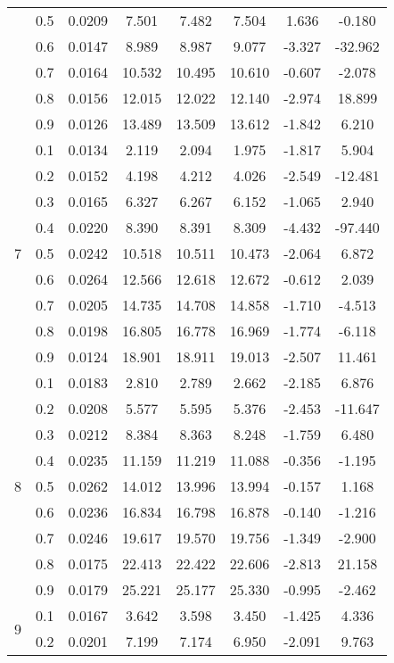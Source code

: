 \documentclass[11pt,a4paper]{report}
\begin{document}
\begin{longtable}{ | c | c || c | c | c | c | c | c | }
 & 0.5 & 0.0209 & 7.501 & 7.482 & 7.504 & 1.636 & -0.180 \\
 & 0.6 & 0.0147 & 8.989 & 8.987 & 9.077 & -3.327 & -32.962 \\
 & 0.7 & 0.0164 & 10.532 & 10.495 & 10.610 & -0.607 & -2.078 \\
 & 0.8 & 0.0156 & 12.015 & 12.022 & 12.140 & -2.974 & 18.899 \\
 & 0.9 & 0.0126 & 13.489 & 13.509 & 13.612 & -1.842 & 6.210 \\
 \hline
\multirow{9}{*}{7} & 0.1 & 0.0134 & 2.119 & 2.094 & 1.975 & -1.817 & 5.904 \\
 & 0.2 & 0.0152 & 4.198 & 4.212 & 4.026 & -2.549 & -12.481 \\
 & 0.3 & 0.0165 & 6.327 & 6.267 & 6.152 & -1.065 & 2.940 \\
 & 0.4 & 0.0220 & 8.390 & 8.391 & 8.309 & -4.432 & -97.440 \\
 & 0.5 & 0.0242 & 10.518 & 10.511 & 10.473 & -2.064 & 6.872 \\
 & 0.6 & 0.0264 & 12.566 & 12.618 & 12.672 & -0.612 & 2.039 \\
 & 0.7 & 0.0205 & 14.735 & 14.708 & 14.858 & -1.710 & -4.513 \\
 & 0.8 & 0.0198 & 16.805 & 16.778 & 16.969 & -1.774 & -6.118 \\
 & 0.9 & 0.0124 & 18.901 & 18.911 & 19.013 & -2.507 & 11.461 \\
 \hline
\multirow{9}{*}{8} & 0.1 & 0.0183 & 2.810 & 2.789 & 2.662 & -2.185 & 6.876 \\
 & 0.2 & 0.0208 & 5.577 & 5.595 & 5.376 & -2.453 & -11.647 \\
 & 0.3 & 0.0212 & 8.384 & 8.363 & 8.248 & -1.759 & 6.480 \\
 & 0.4 & 0.0235 & 11.159 & 11.219 & 11.088 & -0.356 & -1.195 \\
 & 0.5 & 0.0262 & 14.012 & 13.996 & 13.994 & -0.157 & 1.168 \\
 & 0.6 & 0.0236 & 16.834 & 16.798 & 16.878 & -0.140 & -1.216 \\
 & 0.7 & 0.0246 & 19.617 & 19.570 & 19.756 & -1.349 & -2.900 \\
 & 0.8 & 0.0175 & 22.413 & 22.422 & 22.606 & -2.813 & 21.158 \\
 & 0.9 & 0.0179 & 25.221 & 25.177 & 25.330 & -0.995 & -2.462 \\
 \hline
\multirow{9}{*}{9} & 0.1 & 0.0167 & 3.642 & 3.598 & 3.450 & -1.425 & 4.336 \\
 & 0.2 & 0.0201 & 7.199 & 7.174 & 6.950 & -2.091 & 9.763 \\

\end{longtable}
\end{document}
